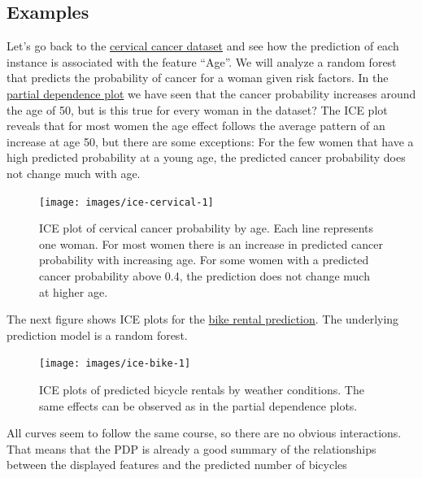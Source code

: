 \documentclass[
  12pt,
]{krantz}
\begin{document}
\hypertarget{examples-4}{%
\subsection{Examples}\label{examples-4}}

Let's go back to the \protect\hyperlink{cervical}{cervical cancer dataset} and see how the prediction of each instance is associated with the feature ``Age''.
We will analyze a random forest that predicts the probability of cancer for a woman given risk factors.
In the \protect\hyperlink{pdp}{partial dependence plot} we have seen that the cancer probability increases around the age of 50, but is this true for every woman in the dataset?
The ICE plot reveals that for most women the age effect follows the average pattern of an increase at age 50, but there are some exceptions:
For the few women that have a high predicted probability at a young age, the predicted cancer probability does not change much with age.

\begin{figure}

{\centering \texttt{[image: images/ice-cervical-1]} 

}

\caption{ICE plot of cervical cancer probability by age. Each line represents one woman. For most women there is an increase in predicted cancer probability with increasing age. For some women with a predicted cancer probability above 0.4, the prediction does not change much at higher age.}\label{fig:ice-cervical}
\end{figure}

The next figure shows ICE plots for the \protect\hyperlink{bike-data}{bike rental prediction}.
The underlying prediction model is a random forest.

\begin{figure}

{\centering \texttt{[image: images/ice-bike-1]} 

}

\caption{ICE plots of predicted bicycle rentals by weather conditions. The same effects can be observed as in the partial dependence plots.}\label{fig:ice-bike}
\end{figure}

All curves seem to follow the same course, so there are no obvious interactions.
That means that the PDP is already a good summary of the relationships between the displayed features and the predicted number of bicycles
\end{document}
